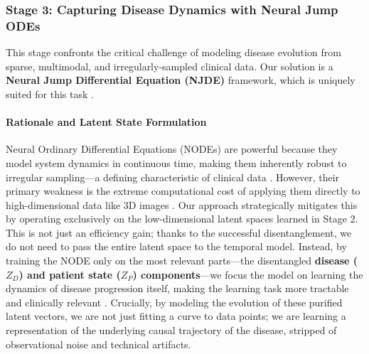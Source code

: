 \documentclass[11pt, a4paper]{article}
\begin{document}
\subsubsection{Stage 3: Capturing Disease Dynamics with Neural Jump ODEs}
This stage confronts the critical challenge of modeling disease evolution from sparse, multimodal, and irregularly-sampled clinical data. Our solution is a \textbf{Neural Jump Differential Equation (NJDE)} framework, which is uniquely suited for this task \cite{GwakSim2020}.

\paragraph{Rationale and Latent State Formulation}
Neural Ordinary Differential Equations (NODEs) are powerful because they model system dynamics in continuous time, making them inherently robust to irregular sampling—a defining characteristic of clinical data \cite{GwakSim2020, JohnsonBulgarelli2023, BelogolovskyGreenberg2023}. However, their primary weakness is the extreme computational cost of applying them directly to high-dimensional data like 3D images \cite{WiewelBecher2018, DavisChoromanski2020}. Our approach strategically mitigates this by operating exclusively on the low-dimensional latent spaces learned in Stage 2. This is not just an efficiency gain; thanks to the successful disentanglement, we do not need to pass the entire latent space to the temporal model. Instead, by training the NODE only on the most relevant parts—the disentangled \textbf{disease ($Z_D$) and patient state ($Z_P$) components}—we focus the model on learning the dynamics of disease progression itself, making the learning task more tractable and clinically relevant \cite{AshmanSo2020, KberKalisch2023, LosadaTerranova2024}. Crucially, by modeling the evolution of these purified latent vectors, we are not just fitting a curve to data points; we are learning a representation of the underlying causal trajectory of the disease, stripped of observational noise and technical artifacts.
\end{document}
